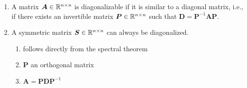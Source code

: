 \begin{enumerate}
    \item
    \begin{definition}[Diagonalizable]
        A matrix $\bm{A} \in \mathbb{R}^{n\times n}$ is diagonalizable if it is similar to a diagonal matrix, i.e., if there exists an invertible matrix $\bm{P} \in \mathbb{R}^{n\times n}$ such that $\bm{D} = \bm{P}^{-1}\bm{AP}$.
        \hfill \cite{mfml/book/mml/Deisenroth-Faisal-Ong}
    \end{definition}

    \item
    \begin{theorem}
        A symmetric matrix $\bm{S} \in \mathbb{R}^{n\times n}$ can always be diagonalized.
        \hfill \cite{mfml/book/mml/Deisenroth-Faisal-Ong}
    \end{theorem}
    \begin{enumerate}
        \item follows directly from the spectral theorem
        \hfill \cite{mfml/book/mml/Deisenroth-Faisal-Ong}

        \item $\bm{P}$ an orthogonal matrix
        \hfill \cite{mfml/book/mml/Deisenroth-Faisal-Ong}

        \item $\bm{A} = \bm{PDP}^{-1}$
        \hfill \cite{mfml/book/mml/Deisenroth-Faisal-Ong}
    \end{enumerate}
\end{enumerate}














